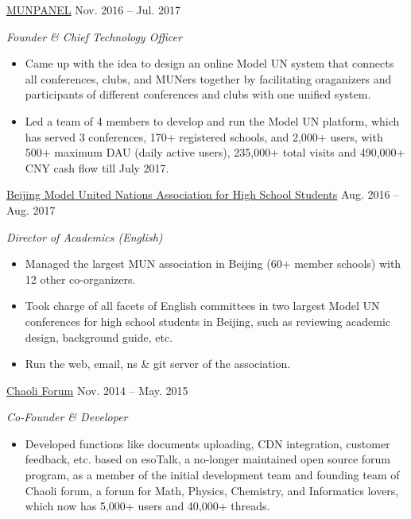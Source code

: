 \documentclass[hidelinks__VERSION__]{adamyi-cv}
\begin{document}
\begin{entrylist}
\entry
{\href{https://www.munpanel.com}{MUNPANEL}}
{Nov. 2016 -- Jul. 2017}
{\emph{Founder \& Chief Technology Officer}
\begin{itemize}
\item Came up with the idea to design an online Model UN system that connects all conferences, clubs, and MUNers together by facilitating oraganizers and participants of different conferences and clubs with one unified system.
\item Led a team of 4 members to develop and run the Model UN platform, which has served 3 conferences, 170+ registered schools, and 2,000+ users, with 500+ maximum DAU (daily active users), 235,000+ total visits and 490,000+ CNY cash flow till July 2017.
\end{itemize}}


\entry
{\href{https://bjmun.cn}{Beijing Model United Nations Association for High School Students}}
{Aug. 2016 -- Aug. 2017}
{\emph{Director of Academics (English)}
\begin{itemize}
\item Managed the largest MUN association in Beijing (60+ member schools) with 12 other co-organizers.
\item Took charge of all facets of English committees in two largest Model UN conferences for high school students in Beijing, such as reviewing academic design, background guide, etc.
\item Run the web, email, ns \& git server of the association.
\end{itemize}}


\entry
{\href{https://chaoli.club}{Chaoli Forum}}
{Nov. 2014 -- May. 2015}
{\emph{Co-Founder \& Developer}
\begin{itemize}
\item Developed functions like documents uploading, CDN integration, customer feedback, etc. based on esoTalk, a no-longer maintained open source forum program, as a member of the initial development team and founding team of Chaoli forum, a forum for Math, Physics, Chemistry, and Informatics lovers, which now has 5,000+ users and 40,000+ threads.
\end{itemize}}




\end{entrylist}
\end{document}
